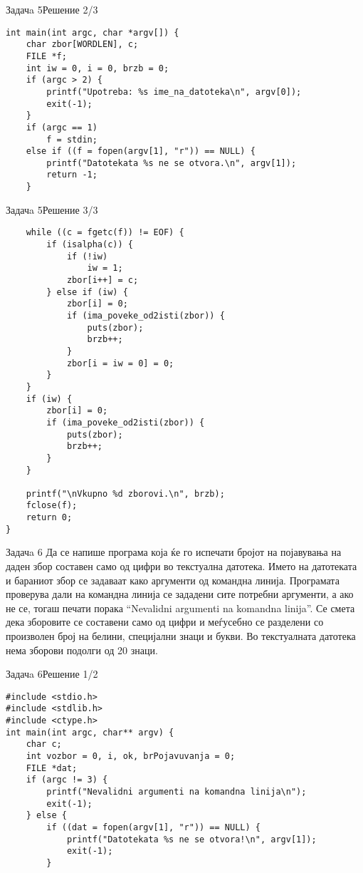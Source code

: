 \begin{frame}[fragile]{Задачa 5}{Решение 2/3}
\begin{lstlisting}
int main(int argc, char *argv[]) {
    char zbor[WORDLEN], c;
    FILE *f;
    int iw = 0, i = 0, brzb = 0;
    if (argc > 2) {
        printf("Upotreba: %s ime_na_datoteka\n", argv[0]);
        exit(-1);
    }
    if (argc == 1)
        f = stdin;
    else if ((f = fopen(argv[1], "r")) == NULL) {
        printf("Datotekata %s ne se otvora.\n", argv[1]);
        return -1;
    }
\end{lstlisting}
\end{frame}

\begin{frame}[fragile]{Задачa 5}{Решение 3/3}
\begin{lstlisting}
    while ((c = fgetc(f)) != EOF) {
        if (isalpha(c)) {
            if (!iw)
                iw = 1;
            zbor[i++] = c;
        } else if (iw) {
            zbor[i] = 0;
            if (ima_poveke_od2isti(zbor)) {
                puts(zbor);
                brzb++;
            }
            zbor[i = iw = 0] = 0;
        }
    }
    if (iw) {
        zbor[i] = 0;
        if (ima_poveke_od2isti(zbor)) {
            puts(zbor);
            brzb++;
        }
    }

    printf("\nVkupno %d zborovi.\n", brzb);
    fclose(f);
    return 0;
}
\end{lstlisting}
\end{frame}

\begin{frame}{Задачa 6}
Да се напише програма која ќе го испечати бројот на појавувања на даден збор
составен само од цифри во текстуална датотека. Името на датотеката и бараниот
збор се задаваат како аргументи од командна линија. Програмата проверува дали на
командна линија се зададени сите потребни аргументи, а ако не се, тогаш печати
порака ``Nevalidni argumenti na komandna linija''. Се смета дека зборовите се
составени само од цифри и меѓусебно се разделени со произволен број на белини,
специјални знаци и букви. Во текстуалната датотека нема зборови подолги од 20
знаци.    
\end{frame}

\begin{frame}[fragile]{Задачa 6}{Решение 1/2}
\begin{lstlisting}
#include <stdio.h>
#include <stdlib.h>
#include <ctype.h>
int main(int argc, char** argv) {
    char c;
    int vozbor = 0, i, ok, brPojavuvanja = 0;
    FILE *dat;
    if (argc != 3) {
        printf("Nevalidni argumenti na komandna linija\n");
        exit(-1);
    } else {
        if ((dat = fopen(argv[1], "r")) == NULL) {
            printf("Datotekata %s ne se otvora!\n", argv[1]);
            exit(-1);
        }
\end{lstlisting}
\end{frame}

